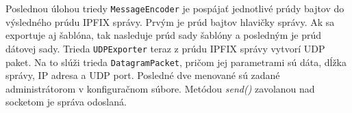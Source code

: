 Poslednou úlohou triedy \verb|MessageEncoder| je pospájať jednotlivé prúdy bajtov do výsledného prúdu IPFIX 
správy. Prvým je prúd bajtov hlavičky správy. Ak sa exportuje aj šablóna, tak nasleduje prúd sady šablóny 
a posledným je prúd dátovej sady. Trieda \verb|UDPExporter| teraz z prúdu IPFIX správy vytvorí 
UDP paket. Na to slúži trieda \verb|DatagramPacket|, pričom jej parametrami sú dáta, dĺžka správy, 
IP adresa a UDP port. Posledné dve menované sú zadané administrátorom v konfiguračnom súbore. Metódou 
\emph{send()} zavolanou nad socketom je správa odoslaná.






